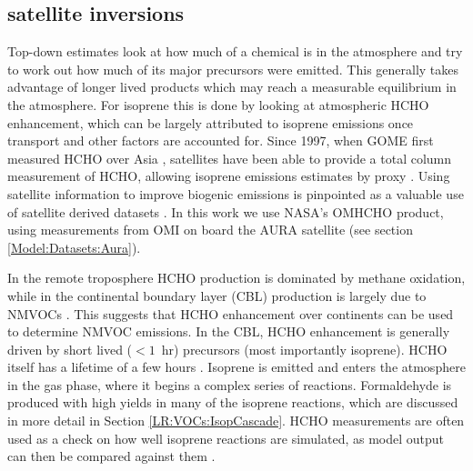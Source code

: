   \subsection{satellite inversions}
    \label{BioIsop:intro:satellite_inversion}
    Top-down estimates look at how much of a chemical is in the atmosphere and try to work out how much of its major precursors were emitted.
    This generally takes advantage of longer lived products which may reach a measurable equilibrium in the atmosphere.
    For isoprene this is done by looking at atmospheric HCHO enhancement, which can be largely attributed to isoprene emissions once transport and other factors are accounted for.
    Since 1997, when GOME first measured HCHO over Asia \parencite{Thomas1998}, satellites have been able to provide a total column measurement of HCHO, allowing isoprene emissions estimates by proxy \parencite{Palmer2001,Bauwens2016}.
    Using satellite information to improve biogenic emissions is pinpointed as a valuable use of satellite derived datasets \parencite{Streets2013}.
    In this work we use NASA's OMHCHO product, using measurements from OMI on board the AURA satellite (see section \ref{Model:Datasets:Aura}).
    
    In the remote troposphere HCHO production is dominated by methane oxidation, while in the continental boundary layer (CBL) production is largely due to NMVOCs \parencite{Abbot2003, Kefauver2014}.
    This suggests that HCHO enhancement over continents can be used to determine NMVOC emissions.
    In the CBL, HCHO enhancement is generally driven by short lived ($<1$~hr) precursors (most importantly isoprene).
    HCHO itself has a lifetime of a few hours \parencite{Kefauver2014}.
    Isoprene is emitted and enters the atmosphere in the gas phase, where it begins a complex series of reactions.
    Formaldehyde is produced with high yields in many of the isoprene reactions, which are discussed in more detail in Section \ref{LR:VOCs:IsopCascade}.
    HCHO measurements are often used as a check on how well isoprene reactions are simulated, as model output can then be compared against them \parencite{Marvin2017}.
    
